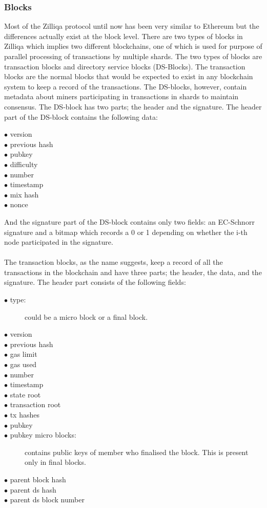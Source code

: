 \documentclass[a4paper,twoside,phd]{BYUPhys}
\begin{document}
\subsubsection{Blocks}
Most of the Zilliqa protocol until now has been very similar to Ethereum but the differences actually exist at the block level. There are two types of blocks in Zilliqa which implies two different blockchains, one of which is used for purpose of parallel processing of transactions by multiple shards. The two types of blocks are transaction blocks and directory service blocks (DS-Blocks). The transaction blocks are the normal blocks that would be expected to exist in any blockchain system to keep a record of the transactions. The DS-blocks, however, contain metadata about miners participating in transactions in shards to maintain consensus. The DS-block has two parts; the header and the signature. The header part of the DS-block contains the following data:
\begin{description}
\item[$\bullet$ version]
\item[$\bullet$ previous hash]
\item[$\bullet$ pubkey]
\item[$\bullet$ difficulty]
\item[$\bullet$ number]
\item[$\bullet$ timestamp]
\item[$\bullet$ mix hash]
\item[$\bullet$ nonce]
\end{description}
And the signature part of the DS-block contains only two fields: an EC-Schnorr signature and a bitmap which records a 0 or 1 depending on whether the i-th node participated in the signature.
\\
\\
The transaction blocks, as the name suggests,  keep a record of all the transactions in the blockchain and have three parts; the header, the data, and the signature. The header part consists of the following fields:
\begin{description}
\item[$\bullet$ type:] could be a micro block or a final block.
\item[$\bullet$ version] 
\item[$\bullet$ previous hash]
\item[$\bullet$ gas limit]
\item[$\bullet$ gas used]
\item[$\bullet$ number]
\item[$\bullet$ timestamp]
\item[$\bullet$ state root]
\item[$\bullet$ transaction root]
\item[$\bullet$ tx hashes]
\item[$\bullet$ pubkey]
\item[$\bullet$ pubkey micro blocks:] contains public keys of member who finalised the block. This is present only in final blocks.
\item[$\bullet$ parent block hash]
\item[$\bullet$ parent ds hash]
\item[$\bullet$ parent ds block number]
\end{description}
\end{document}
